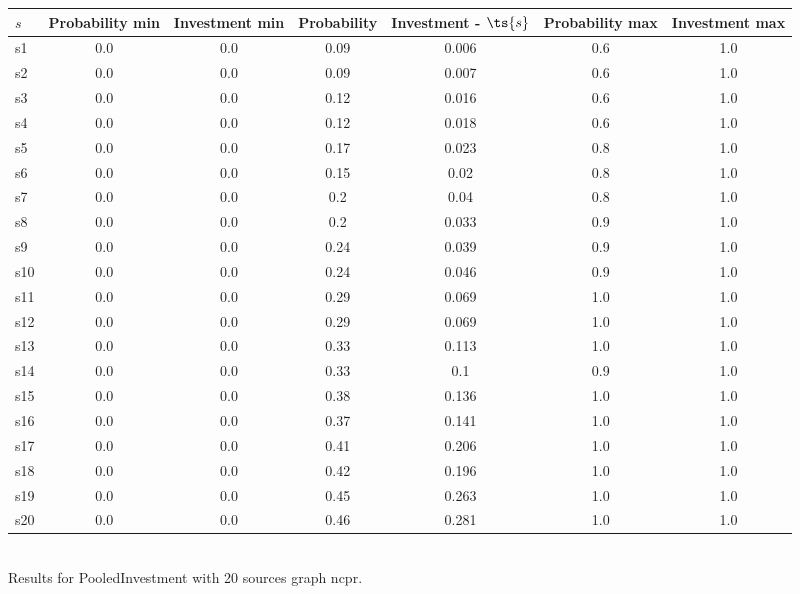\documentclass{article}
\begin{document}
\noindent\begin{tabular}{|l|c|c|c|c|c|c|}
\hline
$s$& Probability min & Investment min & Probability & Investment - $\ts{s}$ & Probability max & Investment max\\
\hline
s1 &0.0 & 0.0 & 0.09 & 0.006 & 0.6 & 1.0\\
\hline
s2 &0.0 & 0.0 & 0.09 & 0.007 & 0.6 & 1.0\\
\hline
s3 &0.0 & 0.0 & 0.12 & 0.016 & 0.6 & 1.0\\
\hline
s4 &0.0 & 0.0 & 0.12 & 0.018 & 0.6 & 1.0\\
\hline
s5 &0.0 & 0.0 & 0.17 & 0.023 & 0.8 & 1.0\\
\hline
s6 &0.0 & 0.0 & 0.15 & 0.02 & 0.8 & 1.0\\
\hline
s7 &0.0 & 0.0 & 0.2 & 0.04 & 0.8 & 1.0\\
\hline
s8 &0.0 & 0.0 & 0.2 & 0.033 & 0.9 & 1.0\\
\hline
s9 &0.0 & 0.0 & 0.24 & 0.039 & 0.9 & 1.0\\
\hline
s10 &0.0 & 0.0 & 0.24 & 0.046 & 0.9 & 1.0\\
\hline
s11 &0.0 & 0.0 & 0.29 & 0.069 & 1.0 & 1.0\\
\hline
s12 &0.0 & 0.0 & 0.29 & 0.069 & 1.0 & 1.0\\
\hline
s13 &0.0 & 0.0 & 0.33 & 0.113 & 1.0 & 1.0\\
\hline
s14 &0.0 & 0.0 & 0.33 & 0.1 & 0.9 & 1.0\\
\hline
s15 &0.0 & 0.0 & 0.38 & 0.136 & 1.0 & 1.0\\
\hline
s16 &0.0 & 0.0 & 0.37 & 0.141 & 1.0 & 1.0\\
\hline
s17 &0.0 & 0.0 & 0.41 & 0.206 & 1.0 & 1.0\\
\hline
s18 &0.0 & 0.0 & 0.42 & 0.196 & 1.0 & 1.0\\
\hline
s19 &0.0 & 0.0 & 0.45 & 0.263 & 1.0 & 1.0\\
\hline
s20 &0.0 & 0.0 & 0.46 & 0.281 & 1.0 & 1.0\\
\hline
\end{tabular}\\

\noindent Results for PooledInvestment with 20 sources graph ncpr.
\end{document}
